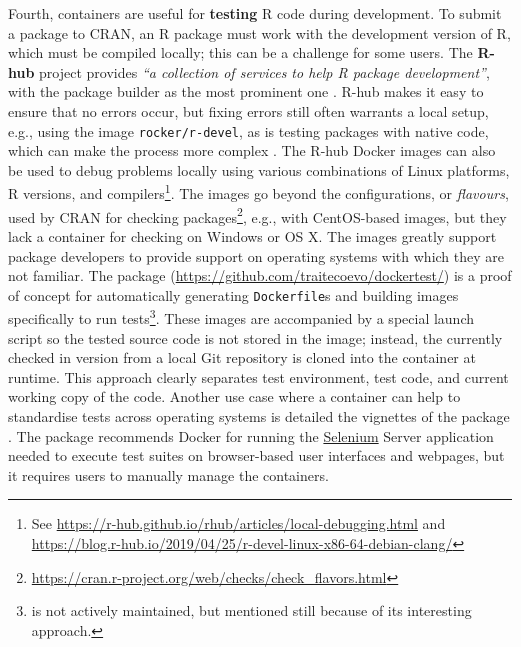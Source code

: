 Fourth, containers are useful for \textbf{testing} R code during
development. To submit a package to CRAN, an R package must work with
the development version of R, which must be compiled locally; this can
be a challenge for some users. The \textbf{R-hub} project provides
\emph{``a collection of services to help R package development''}, with
the package builder as the most prominent one \citep{r-hub_docs_2019}.
R-hub makes it easy to ensure that no errors occur, but fixing errors
still often warrants a local setup, e.g., using the image
\texttt{rocker/r-devel}, as is testing packages with native code, which
can make the process more complex \citep[cf.][]{eckert_building_2018}.
The R-hub Docker images can also be used to debug problems locally using
various combinations of Linux platforms, R versions, and
compilers\footnote{See \href{https://r-hub.github.io/rhub/articles/local-debugging.html}{https://r-hub.github.io/rhub/articles/local-debugging.html} and \href{https://blog.r-hub.io/2019/04/25/r-devel-linux-x86-64-debian-clang/}{https://blog.r-hub.io/2019/04/25/r-devel-linux-x86-64-debian-clang/}}.
The images go beyond the configurations, or \emph{flavours}, used by
CRAN for checking
packages\footnote{\href{https://cran.r-project.org/web/checks/check_flavors.html}{https://cran.r-project.org/web/checks/check\_flavors.html}},
e.g., with CentOS-based images, but they lack a container for checking
on Windows or OS X. The images greatly support package developers to
provide support on operating systems with which they are not familiar.
The package 
(\url{https://github.com/traitecoevo/dockertest/}) is a proof of concept
for automatically generating \texttt{Dockerfile}s and building images
specifically to run
tests\footnote{ is not actively maintained, but mentioned still because of its interesting approach.}.
These images are accompanied by a special launch script so the tested
source code is not stored in the image; instead, the currently checked
in version from a local Git repository is cloned into the container at
runtime. This approach clearly separates test environment, test code,
and current working copy of the code. \label{rselenium} Another use case
where a container can help to standardise tests across operating systems
is detailed the vignettes of the package 
\citep{rselenium_2019}. The package recommends Docker for running the
\href{https://selenium.dev/}{Selenium} Server application needed to
execute test suites on browser-based user interfaces and webpages, but
it requires users to manually manage the containers.

